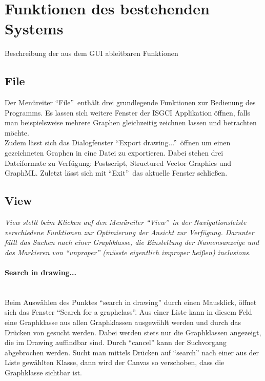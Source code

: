 \documentclass[10pt,a4paper]{article}
\newcommand{\G}[1]{\glqq\text{#1}\grqq} %
\begin{document}
\section{Funktionen des bestehenden Systems}
\label{sec:bestSys}
Beschreibung der aus dem GUI ableitbaren Funktionen
\subsection{File}
Der Menüreiter "`File"'\ enthält drei grundlegende Funktionen zur Bedienung des Programms. Es lassen sich weitere Fenster der ISGCI Applikation öffnen, falls man beispielsweise mehrere Graphen gleichzeitig zeichnen lassen und betrachten möchte.\\
Zudem lässt sich das Dialogfenster "`Export drawing..."'\ öffnen um einen gezeichneten Graphen in eine Datei zu exportieren. Dabei stehen drei Dateiformate zu Verfügung: Postscript, Structured Vector Graphics und GraphML. Zuletzt lässt sich mit "`Exit"'\ das aktuelle Fenster schließen.\\

\subsection{View}
\emph{View stellt beim Klicken auf den Menüreiter "`View"'\ in der Navigationsleiste verschiedene Funktionen zur Optimierung der Ansicht zur Verfügung. Darunter fällt das Suchen nach einer Graphklasse, die Einstellung der Namensanzeige und das Markieren von "`unproper"' (müsste eigentlich improper heißen) inclusions.}\\

\paragraph{Search in drawing...}\ \\
Beim Auswählen des Punktes "`search in drawing"' durch einen Mausklick, öffnet sich das Fenster "`Search for a graphclass"'. Aus einer Liste kann in diesem Feld eine Graphklasse aus allen Graphklassen ausgewählt werden und durch das Drücken von \G{Search} gesucht werden. Dabei werden stets nur die Graphklassen angezeigt, die im Drawing auffindbar sind. Durch "`cancel"' kann der Suchvorgang abgebrochen werden. Sucht man mittels Drücken auf "`search"' nach einer aus der Liste gewählten Klasse, dann wird der Canvas so verschoben, dass die Graphklasse sichtbar ist.
\end{document}
